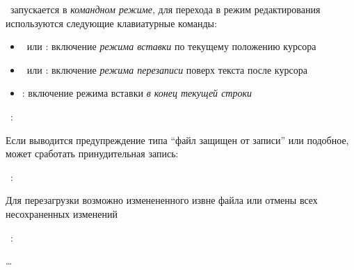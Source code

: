 
\vim\ запускается в \emph{командном режиме}, для перехода в режим редактирования
используются следующие клавиатурные команды:

\begin{itemize}
  \item {}\ или : включение \emph{режима вставки} по текущему
  положению курсора
  \item {}\ или : включение \emph{режима перезаписи}
  поверх текста после курсора
  \item {}: включение режима вставки \emph{в конец текущей строки}
\end{itemize}




\ :\ \ 
\bigskip

Если выводится предупреждение типа ``файл защищен от записи'' или подобное,
может сработать принудительная запись:

\bigskip
{}\ :\ \keys{!}\ \ 


Для перезагрузки возможно изменененного извне файла или отмены всех
несохраненных изменений

\bigskip
{}\ :\ \ 


\ldots

\secup

